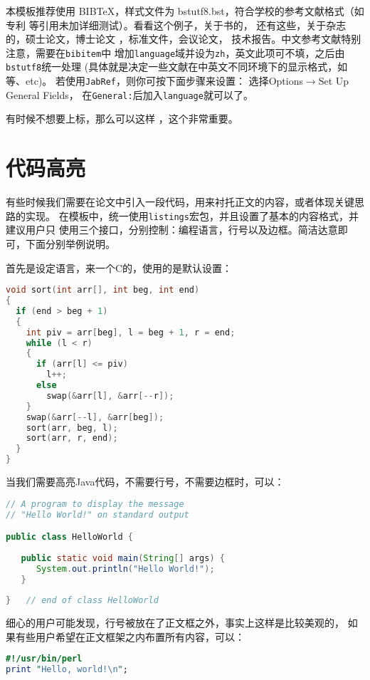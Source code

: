 本模板推荐使用 BIB\TeX，样式文件为 bstutf8.bst，符合学校的参考文献格式（如专利
等引用未加详细测试）。看看这个例子，关于书的，
还有这些，关于杂志的，硕士论文，博士论文
，标准文件，会议论文，%
技术报告。中文参考文献\textsf{特别注意}，需要在\verb|bibitem|中
增加\verb|language|域并设为\verb|zh|，英文此项可不填，之后由\verb|bstutf8|统一处理
(具体就是决定一些文献在中英文不同环境下的显示格式，如等、etc)。
若使用\verb|JabRef|，则你可按下面步骤来设置：
选择\textsf{Options}$\rightarrow$\textsf{Set Up General Fields}，
在\verb|General:|后加入\verb|language|就可以了。

有时候不想要上标，那么可以这样 \cite{shaheshang}，这个非常重要。

\section{代码高亮}
有些时候我们需要在论文中引入一段代码，用来衬托正文的内容，或者体现关键思路的实现。
在模板中，统一使用\texttt{listings}宏包，并且设置了基本的内容格式，并建议用户只
使用三个接口，分别控制：编程语言，行号以及边框。简洁达意即可，下面分别举例说明。

首先是设定语言，来一个C的，使用的是默认设置：
\begin{lstlisting}[language=C]
void sort(int arr[], int beg, int end)
{
  if (end > beg + 1)
  {
    int piv = arr[beg], l = beg + 1, r = end;
    while (l < r)
    {
      if (arr[l] <= piv)
        l++;
      else
        swap(&arr[l], &arr[--r]);
    }
    swap(&arr[--l], &arr[beg]);
    sort(arr, beg, l);
    sort(arr, r, end);
  }
}
\end{lstlisting}

当我们需要高亮Java代码，不需要行号，不需要边框时，可以：
\begin{lstlisting}[language=Java,numbers=none,frame=none]
// A program to display the message
// "Hello World!" on standard output

public class HelloWorld {
 
   public static void main(String[] args) {
      System.out.println("Hello World!");
   }
      
}   // end of class HelloWorld
\end{lstlisting}

细心的用户可能发现，行号被放在了正文框之外，事实上这样是比较美观的，
如果有些用户希望在正文框架之内布置所有内容，可以：
\begin{lstlisting}[language=perl,xleftmargin=2em,framexleftmargin=1.5em]
#!/usr/bin/perl
print "Hello, world!\n";
\end{lstlisting}

